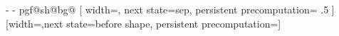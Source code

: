 {{{      %
      \pgf@x-\pgf@x%
      \pgf@y-\pgf@y%
    }%
    \csname pgf@sh@bg@\endcsname%
  }
  [
    width=\pgf@lib@shapedecoration@aftershape-1sp,
    next state=sep,
    persistent precomputation=
    {
      \ifpgf@lib@shapedecoration@betweenborders%
        \pgf@x\pgf@lib@shapedecoration@width\relax%
        \pgf@x.5\pgf@x%
        \edef\pgf@lib@shapedecoration@aftershape{\the\pgf@x}%
      \else%
        \edef\pgf@lib@shapedecoration@aftershape{0pt}%
      \fi%
    }
  ]
  {}
  [width=\pgf@lib@shapedecoration@sep,next state=before shape,
              persistent precomputation=\def\pgf@lib@shapedecoration@beforeshape{0pt}]
  {}
  {
    \pgfpathmoveto{\pgfpointdecoratedpathlast}%
  }
}

\def\pgf@lib@shapedecoration@setkeyword,{%
  \pgfutil@ifnextchar\pgf@stop{\def\pgf@temp{}\pgf@lib@@@shapedecoration@setkeyword}{\pgf@lib@@shapedecoration@setkeyword}%
}
\def\pgf@lib@@shapedecoration@setkeyword#1,{\def\pgf@temp{#1}\pgf@lib@@@shapedecoration@setkeyword}
\def\pgf@lib@@@shapedecoration@setkeyword\pgf@stop{%
  \ifx\pgf@temp\pgf@lib@shapedecoration@borderstext%
    \pgf@lib@shapedecoration@betweenborderstrue%
  \else%
    \pgf@lib@shapedecoration@betweenbordersfalse%
  \fi%
}



\endinput